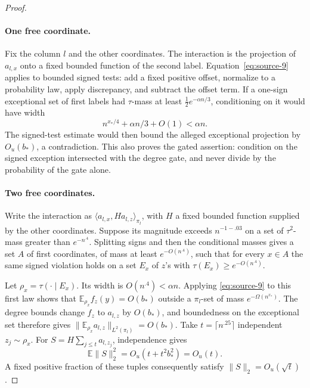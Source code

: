 \begin{proof}\leavevmode\par
\paragraph{One free coordinate.}
Fix the column \(l\) and the other coordinates. The interaction is the projection of \(a_{l,x}\) onto a fixed bounded function of the second label. Equation~\eqref{eq:source-9} applies to bounded signed tests: add a fixed positive offset, normalize to a probability law, apply discrepancy, and subtract the offset term. If a one-sign exceptional set of first labels had \(\tau\)-mass at least \(\tfrac12e^{-\alpha n/3}\), conditioning on it would have width
\[
 n^{x_*/4}+\alpha n/3+O(1)<\alpha n.
\]
The signed-test estimate would then bound the alleged exceptional projection by \(O_u(b_*)\), a contradiction. This also proves the gated assertion: condition on the signed exception intersected with the degree gate, and never divide by the probability of the gate alone.

\paragraph{Two free coordinates.}
Write the interaction as \(\langle a_{l,x},H a_{l,z}\rangle_{\pi_l}\), with \(H\) a fixed bounded function supplied by the other coordinates. Suppose its magnitude exceeds \(n^{-1-.03}\) on a set of \(\tau^2\)-mass greater than \(e^{-n^{.4}}\). Splitting signs and then the conditional masses gives a set \(A\) of first coordinates, of mass at least \(e^{-O(n^{.4})}\), such that for every \(x\in A\) the same signed violation holds on a set \(E_x\) of \(z\)'s with \(\tau(E_x)\ge e^{-O(n^{.4})}\).

Let \(\rho_x=\tau(\cdot\mid E_x)\). Its width is \(O(n^{.4})<\alpha n\). Applying \eqref{eq:source-9} to this first law shows that \(\mathbb E_{\rho_x}f_z(y)=O(b_*)\) outside a \(\pi_l\)-set of mass \(e^{-\Omega(n^{x_*})}\). The degree bounds change \(f_z\) to \(a_{l,z}\) by \(O(b_*)\), and boundedness on the exceptional set therefore gives
\(\|\mathbb E_{\rho_x}a_{l,z}\|_{L^2(\pi_l)}=O(b_*)\).
Take \(t=\lceil n^{.25}\rceil\) independent \(z_j\sim\rho_x\). For \(S=H\sum_{j\le t}a_{l,z_j}\), independence gives
\[
 \mathbb E\|S\|_2^2=O_u(t+t^2b_*^2)=O_u(t).
\]
A fixed positive fraction of these tuples consequently satisfy \(\|S\|_2=O_u(\sqrt t)\).


\end{proof}
